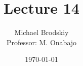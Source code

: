 


\title{Lecture 14}
\date{\today}
\author{Michael Brodskiy\\ \small Professor: M. Onabajo}



\maketitle

